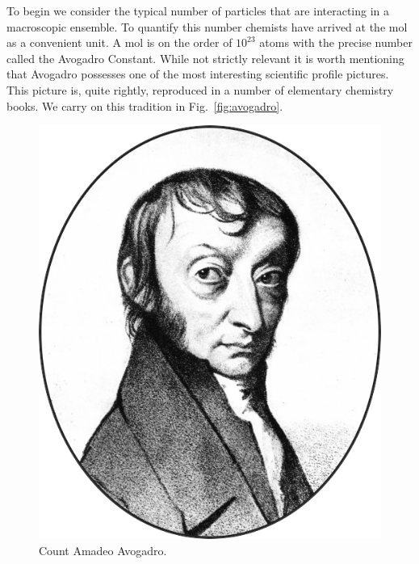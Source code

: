 To begin we consider the typical number of particles 
that are interacting in a macroscopic ensemble.
To quantify this number chemists have arrived at the mol as a convenient unit. 
A mol is on the order of $10^{23}$ atoms with
the precise number called the Avogadro Constant. While not strictly relevant
it is worth mentioning that Avogadro possesses one of the most
interesting scientific profile pictures. This picture is, quite rightly, reproduced
in a number of elementary chemistry books. We carry on this tradition 
in Fig.~\ref{fig:avogadro}.
%
\begin{figure}
\begin{center}
\includegraphics[scale=0.4]{./intro/Amadeo_Avogadro.png}
\end{center}
\caption{Count Amadeo Avogadro.}
\end{figure}
%

